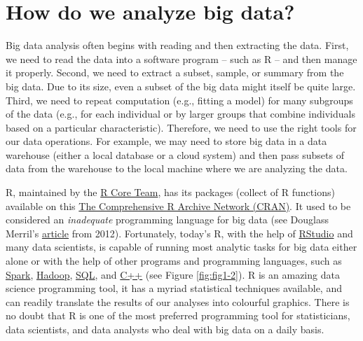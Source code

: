 \documentclass[]{book}
\begin{document}
\hypertarget{how-do-we-analyze-big-data}{%
\section{How do we analyze big data?}\label{how-do-we-analyze-big-data}}

Big data analysis often begins with reading and then extracting the data. First, we need to read the data into a software program -- such as R -- and then manage it properly. Second, we need to extract a subset, sample, or summary from the big data. Due to its size, even a subset of the big data might itself be quite large. Third, we need to repeat computation (e.g., fitting a model) for many subgroups of the data (e.g., for each individual or by larger groups that combine individuals based on a particular characteristic). Therefore, we need to use the right tools for our data operations. For example, we may need to store big data in a data warehouse (either a local database or a cloud system) and then pass subsets of data from the warehouse to the local machine where we are analyzing the data.

R, maintained by the \href{https://www.r-project.org/contributors.html}{R Core Team}, has its packages (collect of R functions) available on this \href{https://cran.r-project.org/}{The Comprehensive R Archive Network (CRAN)}. It used to be considered an \emph{inadequate} programming language for big data (see Douglass Merril's \href{https://www.forbes.com/sites/douglasmerrill/2012/05/01/r-is-not-enough-for-big-data/\#59c7ad9b5924}{article} from 2012). Fortunately, today's R, with the help of \href{https://www.rstudio.com/}{RStudio} and many data scientists, is capable of running most analytic tasks for big data either alone or with the help of other programs and programming languages, such as \href{https://spark.apache.org/docs/latest/sparkr.html}{Spark}, \href{https://hadoop.apache.org/}{Hadoop}, \href{https://en.wikipedia.org/wiki/SQL}{SQL}, and \href{http://www.cplusplus.com/}{C++} (see Figure \ref{fig:fig1-2}). R is an amazing data science programming tool, it has a myriad statistical techniques available, and can readily translate the results of our analyses into colourful graphics. There is no doubt that R is one of the most preferred programming tool for statisticians, data scientists, and data analysts who deal with big data on a daily basis.
\end{document}
